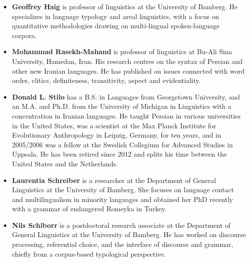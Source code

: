 
\begin{itemize}
    \item[] \textbf{Geoffrey Haig} is professor of linguistics at the University of Bamberg. He specializes in language typology and areal linguistics, with a focus on quantitative methodologies drawing on multi-lingual spoken-language corpora. 
    \item[] \textbf{Mohammad Rasekh-Mahand} is professor of linguistics at Bu-Ali Sina University, Hamedan, Iran. His research centres on the syntax of Persian and other new Iranian languages. He has published on issues connected with word order, clitics, definiteness, transitivity, aspect and evidentiality. 
    \item[] \textbf{Donald L. Stilo} has a B.S. in Languages from Georgetown University, and an M.A. and Ph.D. from the University of Michigan in Linguistics with a concentration in Iranian languages. He taught Persian in various universities in the United States, was a scientist at the Max Planck Institute for Evolutionary Anthropology in Leipzig, Germany, for ten years, and in 2005/2006 was a fellow at the Swedish Collegium for Advanced Studies in Uppsala. He has been retired since 2012 and splits his time between the United States and the Netherlands.
    \item[] \textbf{Laurentia Schreiber} is a researcher at the Department of General Linguistics at the University of Bamberg. She focuses on language contact and multilingualism in minority languages and obtained her PhD recently with a grammar of endangered Romeyka in Turkey.
    \item[] \textbf{Nils Schiborr} is a postdoctoral research associate at the Department of General Linguistics at the University of Bamberg. He has worked on discourse processing, referential choice, and the interface of discourse and grammar, chiefly from a corpus-based typological perspective.
\end{itemize}







